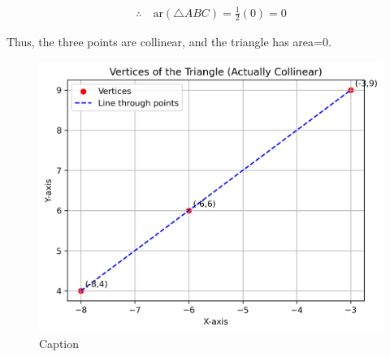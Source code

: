 \documentclass[journal]{IEEEtran}
\begin{document}
\begin{align}
\therefore \quad \text{ar}(\triangle ABC) = \frac{1}{2}(0) = 0
\end{align}


\noindent
Thus, the three points are collinear, and the triangle has area=0.
\begin{figure}[h]
    \centering
    \includegraphics[width=0.9\linewidth]{figs/01.png}
    \caption{Caption}
    \label{fig:placeholder}
\end{figure}
\end{document}
